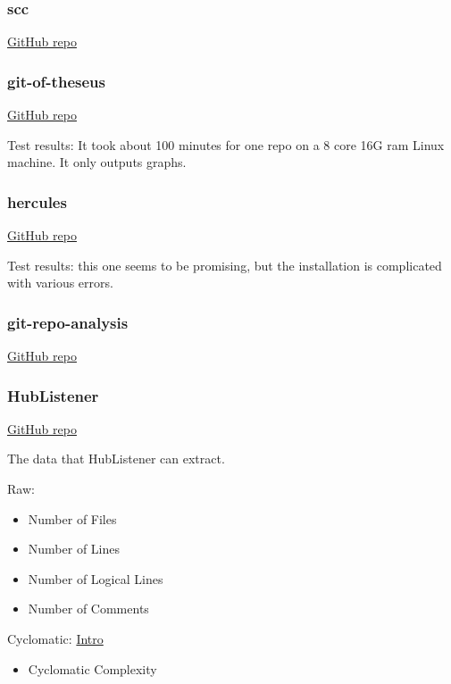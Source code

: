 \documentclass[letterpaper,cleveref]{lipics-v2019}
\theoremstyle{definition}
\begin{document}
\subsubsection{scc}

\href{https://github.com/boyter/scc}{GitHub repo}

\subsubsection{git-of-theseus}

\href{https://github.com/erikbern/git-of-theseus}{GitHub repo}

Test results: It took about 100 minutes for one repo on a 8 core 16G ram Linux
machine. It only outputs graphs.

\subsubsection{hercules}

\href{https://github.com/src-d/hercules}{GitHub repo}

Test results: this one seems to be promising, but the installation is
complicated with various errors.

\subsubsection{git-repo-analysis}
\href{https://github.com/larsxschneider/git-repo-analysis}{GitHub repo}

\subsubsection{HubListener}
\href{https://github.com/pjmc-oliveira/HubListener}{GitHub repo}

The data that HubListener can extract.

Raw:
\begin{itemize}
\item Number of Files
\item Number of Lines
\item Number of Logical Lines
\item Number of Comments
\end{itemize}

Cyclomatic:
\href{https://www.geeksforgeeks.org/cyclomatic-complexity/}{Intro}
\begin{itemize}
\item Cyclomatic Complexity
\end{itemize}
\end{document}
